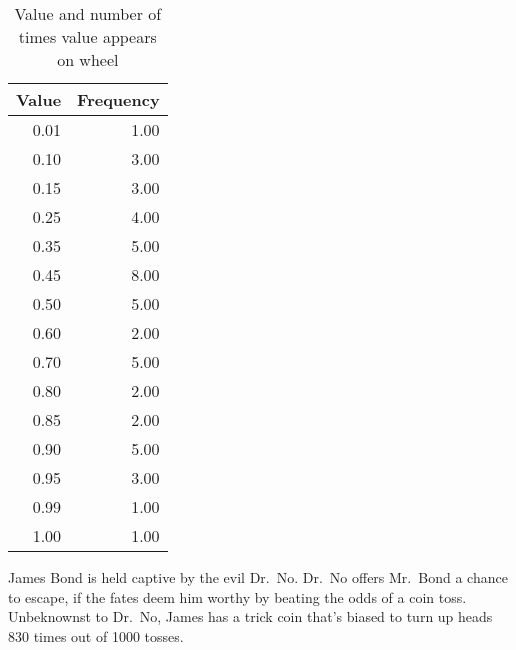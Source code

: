 \documentclass[11pt]{exam}
\begin{document}
\begin{questions}
\begin{table}[ht]
\begin{center}
\begin{tabular}{rr}
  \hline
Value & Frequency \\ 
  \hline
0.01 & 1.00 \\ 
  0.10 & 3.00 \\ 
  0.15 & 3.00 \\ 
  0.25 & 4.00 \\ 
  0.35 & 5.00 \\ 
  0.45 & 8.00 \\ 
  0.50 & 5.00 \\ 
  0.60 & 2.00 \\ 
  0.70 & 5.00 \\ 
  0.80 & 2.00 \\ 
  0.85 & 2.00 \\ 
  0.90 & 5.00 \\ 
  0.95 & 3.00 \\ 
  0.99 & 1.00 \\ 
  1.00 & 1.00 \\ 
   \hline
\end{tabular}
\caption{Value and number of times value appears on wheel}
\label{tab:pir}
\end{center}
\end{table}%




\question James Bond is held captive by the evil Dr.~No.  Dr.~No offers
Mr.~Bond a chance to escape, if the fates deem him worthy by beating the
odds of a coin toss.  Unbeknownst to Dr.~No, James has a trick coin that's
biased to turn up heads 
830 times out of 1000 tosses.
\end{questions}
\end{document}
